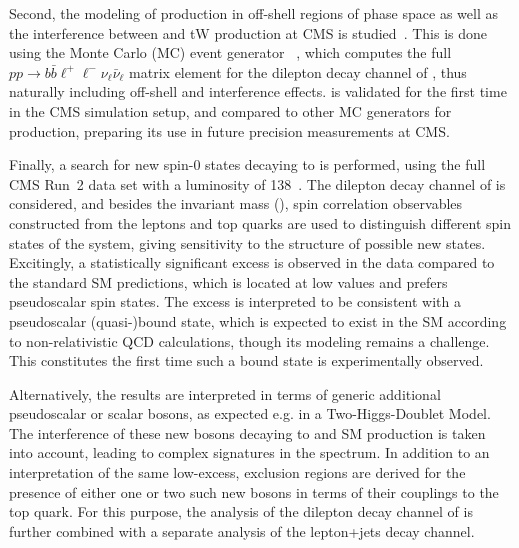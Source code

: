 
Second, the modeling of \ttbar production in off-shell regions of phase space as well as the interference between \ttbar and tW production at CMS is studied~\cite{CMS:NOTE-2023-015}. This is done using the Monte Carlo (MC) event generator \bbfourl~\cite{Jezo:2016ujg}, which computes the full $p p \rightarrow b \bar{b} \ell^+ \ell^- \nu_{\ell} \bar{\nu}_{\ell}$ matrix element for the dilepton decay channel of \ttbar, thus naturally including off-shell and interference effects. \bbfourl is validated for the first time in the CMS simulation setup, and compared to other MC generators for \ttbar production, preparing its use in future precision \ttbar measurements at CMS.


Finally, a search for new spin-0 states decaying to \ttbar is performed, using the full CMS Run~2 data set with a luminosity of \SI{138}{\fbinv}~\cite{CMS:TOP-24-007,CMS:HIG-22-013}. The dilepton decay channel of \ttbar is considered, and besides the invariant \ttbar mass (\mtt), spin correlation observables constructed from the leptons and top quarks are used to distinguish different spin states of the \ttbar system, giving sensitivity to the \CP structure of possible new states. Excitingly, a statistically significant excess is observed in the data compared to the standard SM predictions, which is located at low \mtt values and prefers pseudoscalar spin states. The excess is interpreted to be consistent with a pseudoscalar \ttbar (quasi-)bound state, which is expected to exist in the SM according to non-relativistic QCD calculations, though its modeling remains a challenge. This constitutes the first time such a \ttbar bound state is experimentally observed.

Alternatively, the results are interpreted in terms of generic additional pseudoscalar or scalar bosons, as expected e.g. in a Two-Higgs-Doublet Model. The interference of these new bosons decaying to \ttbar and SM \ttbar production is taken into account, leading to complex signatures in the \mtt spectrum. In addition to an interpretation of the same low-\mtt excess, exclusion regions are derived for the presence of either one or two such new bosons in terms of their couplings to the top quark. For this purpose, the analysis of the dilepton decay channel of \ttbar is further combined with a separate analysis of the lepton+jets decay channel.

